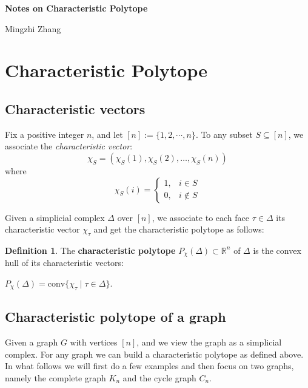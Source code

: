 \documentclass[12pt]{article}
\theoremstyle{definition}
\newtheorem{defi}[thm]{Definition}
\numberwithin{equation}{subsection}
\begin{document}
\begin{center}
{\Large\bf 
Notes on Characteristic Polytope
}\\ [7pt]
\end{center}

\vskip 3mm

\begin{center}
Mingzhi Zhang
\end{center}

\vskip 3mm

\section{Characteristic Polytope}

\subsection{Characteristic vectors}
Fix a positive integer $n$, and let $[n]:= \{1, 2, \cdots , n\}$. To any subset $S \subseteq [n]$, we associate the \textit{characteristic vector}:
\[
\chi_{S} = (\chi_{S}(1), \chi_{S}(2), \ldots, \chi_{S}(n))
\]
where 
\[
\chi_{S}(i) = 
\begin{cases} 
1, & i \in S \\
0, & i \notin S
\end{cases}
\]

Given a simplicial complex $\Delta$ over $[n]$, we associate to each face $\tau \in \Delta$ its characteristic vector $\chi_{\tau}$ and get the characteristic polytope as follows:

\begin{defi}
    The \textbf{characteristic polytope} $P_{\chi}(\Delta) \subset \mathbb{R}^{n}$ of $\Delta$ is the convex hull of its characteristic vectors:
\begin{center}
    $P_{\chi}(\Delta) = \text{conv} \{\chi_{\tau} \mid \tau \in \Delta\}$.
\end{center}
\end{defi}

\subsection{Characteristic polytope of a graph}
Given a graph $G$ with vertices $[n]$, and we view the graph as a simplicial complex. For any graph we can build a characteristic polytope as defined above. In what follows we will first do a few examples and then focus on two graphs, namely the complete graph $K_n$ and the cycle graph $C_n$. 
\end{document}
